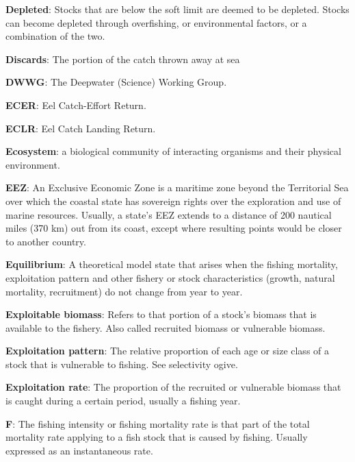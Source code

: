\documentclass{mpi-plenary}
\theoremstyle{definition}
\theoremstyle{definition}
\theoremstyle{definition}
\theoremstyle{remark}
\begin{document}
\protect\hypertarget{def-depleted}{}{} \textbf{Depleted}: Stocks that
are below the soft limit are deemed to be depleted. Stocks can become
depleted through overfishing, or environmental factors, or a combination
of the two.

\protect\hypertarget{def-discards}{}{} \textbf{Discards}: The portion of
the catch thrown away at sea

\protect\hypertarget{def-dwwg}{}{} \textbf{DWWG}: The Deepwater
(Science) Working Group.

\protect\hypertarget{def-ecer}{}{} \textbf{ECER}: Eel Catch-Effort
Return.

\protect\hypertarget{def-eclr}{}{} \textbf{ECLR}: Eel Catch Landing
Return.

\protect\hypertarget{def-ecosystem}{}{} \textbf{Ecosystem}: a biological
community of interacting organisms and their physical environment.

\protect\hypertarget{def-eez}{}{} \textbf{EEZ}: An Exclusive Economic
Zone is a maritime zone beyond the Territorial Sea over which the
coastal state has sovereign rights over the exploration and use of
marine resources. Usually, a state's EEZ extends to a distance of 200
nautical miles (370 km) out from its coast, except where resulting
points would be closer to another country.

\protect\hypertarget{def-equilibrium}{}{} \textbf{Equilibrium}: A
theoretical model state that arises when the fishing mortality,
exploitation pattern and other fishery or stock characteristics (growth,
natural mortality, recruitment) do not change from year to year.

\protect\hypertarget{def-exploitable-biomass}{}{} \textbf{Exploitable
biomass}: Refers to that portion of a stock's biomass that is available
to the fishery. Also called recruited biomass or vulnerable biomass.

\protect\hypertarget{def-exploitation-pattern}{}{} \textbf{Exploitation
pattern}: The relative proportion of each age or size class of a stock
that is vulnerable to fishing. See selectivity ogive.

\protect\hypertarget{def-exploitation-rate}{}{} \textbf{Exploitation
rate}: The proportion of the recruited or vulnerable biomass that is
caught during a certain period, usually a fishing year.

\protect\hypertarget{def-f}{}{} \textbf{F}: The fishing intensity or
fishing mortality rate is that part of the total mortality rate applying
to a fish stock that is caused by fishing. Usually expressed as an
instantaneous rate.
\end{document}
